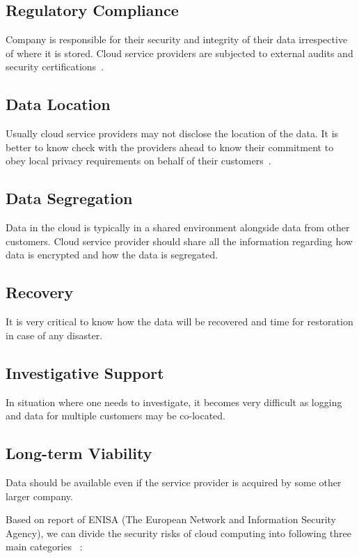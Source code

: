 \subsection{Regulatory Compliance}
Company is responsible for their security and integrity of their data irrespective
of where it is stored. Cloud service providers are subjected to external audits
and security certifications~\cite{hid-sp18-513-gartner}. 

\subsection{Data Location} 
Usually cloud service providers may not disclose the location of the data.
It is better to know check with the providers ahead to know their commitment to
obey local privacy requirements on behalf of their customers~\cite{hid-sp18-513-gartner}.

\subsection{Data Segregation} 
Data in the cloud is typically in a shared environment alongside data from 
other customers. Cloud service provider should share all the information
regarding how data is encrypted and how the data is segregated.

\subsection{Recovery} 
It is very critical to know how the data will be recovered and time for restoration
in case of any disaster. 

\subsection{Investigative Support} 
In situation where one needs to investigate, it becomes very difficult as logging 
and data for multiple customers may be co-located.

\subsection{Long-term Viability} 
Data should be available even if the service provider is acquired by some
other larger company.


Based on report of ENISA (The European Network and Information Security Agency),
we can divide the security risks of cloud computing into following three main 
categories~\cite{hid-sp18-513-enisa} :

